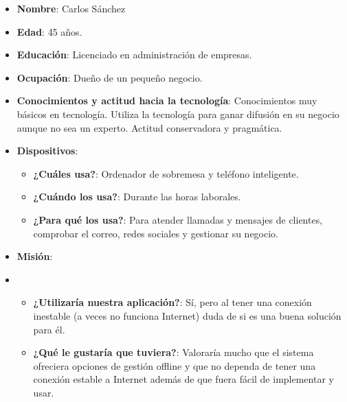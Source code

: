     \begin{itemize}
        \item \textbf{Nombre}: Carlos Sánchez
        \item \textbf{Edad}: 45 años.
        \item \textbf{Educación}: Licenciado en administración de empresas.
        \item \textbf{Ocupación}: Dueño de un pequeño negocio.
        \item \textbf{Conocimientos y actitud hacia la tecnología}: Conocimientos muy básicos en tecnología. Utiliza la tecnología para ganar difusión en su negocio aunque no sea un experto. Actitud conservadora y pragmática.
        \item \textbf{Dispositivos}:
            \begin{itemize}

            \item \textbf{¿Cuáles usa?}: Ordenador de sobremesa y teléfono inteligente.
            \item \textbf{¿Cuándo los usa?}: Durante las horas laborales.
            \item \textbf{¿Para qué los usa?}: Para atender llamadas y mensajes de clientes, comprobar el correo, redes sociales y gestionar su negocio.

            \end{itemize}
        \item \textbf{Misión}:
        \item 
            \begin{itemize}

                \item \textbf{¿Utilizaría nuestra aplicación?}: Sí, pero al tener una conexión inestable (a veces no funciona Internet) duda de si es una buena solución para él.

                \item \textbf{¿Qué le gustaría que tuviera?}: Valoraría mucho que el sistema ofreciera opciones de gestión offline y que no dependa de tener una conexión estable a Internet además de que fuera fácil de implementar y usar.

            \end{itemize}
        
    \end{itemize}

